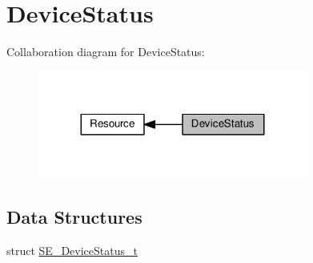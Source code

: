 \hypertarget{group__DeviceStatus}{}\section{Device\+Status}
\label{group__DeviceStatus}
Collaboration diagram for Device\+Status\+:\nopagebreak
\begin{figure}[H]
\begin{center}
\leavevmode
\includegraphics[width=251pt]{group__DeviceStatus}
\end{center}
\end{figure}
\subsection*{Data Structures}
\begin{DoxyCompactItemize}
\item 
struct \hyperlink{structSE__DeviceStatus__t}{S\+E\+\_\+\+Device\+Status\+\_\+t}
\end{DoxyCompactItemize}
